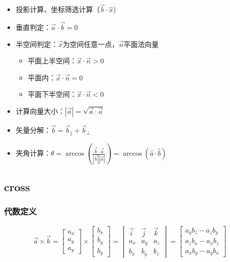 \documentclass[11pt,a4paper]{report}
\begin{document}
\begin{itemize}
\item 投影计算、坐标筛选计算（$\vec{b}\cdot\hat{x}$)
\item 垂直判定：$\vec{a}\cdot\vec{b} = 0$

\item 半空间判定：$\vec{x}$为空间任意一点，$\vec{n}$平面法向量
\begin{itemize}
\item 平面上半空间：$\vec{x}\cdot\vec{n} > 0$
\item 平面内：$\vec{x}\cdot\vec{n} = 0$
\item 平面下半空间：$\vec{x}\cdot\vec{n} < 0$
\end{itemize}
 
\item 计算向量大小：$|\vec{a}| =\sqrt{ \vec{a}\cdot\vec{a}}$
\item 矢量分解：$ \vec{b}  =  \vec{b}_\parallel  + \vec{b}_\perp$
\item 夹角计算：$\theta = \arccos(\frac{\vec{b}\cdot\vec{a}}{|\vec{b}||\vec{a}|})  = \arccos(\hat{a}\cdot\hat{b})$
\end{itemize}

\subsection{cross}

\subsubsection{代数定义}

\[
\vec{a} \times \vec{b} = 
\begin{bmatrix}
a_x \\
a_y \\
a_y 
\end{bmatrix} \times
\begin{bmatrix}
b_x \\
b_y \\
b_y 
\end{bmatrix} = 
\begin{vmatrix}
\vec{i} & \vec{j} & \vec{k} \\
a_x & a_y & a_z \\
b_x & b_y & b_z
\end{vmatrix} = 
\begin{bmatrix}
a_yb_z - a_zb_y \\
a_zb_x - a_xb_z \\
a_xb_y - a_yb_x 
\end{bmatrix}
\]
\end{document}
